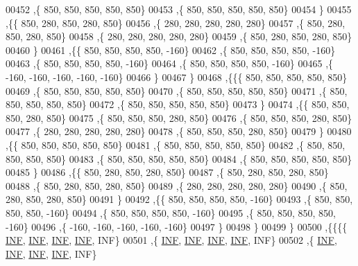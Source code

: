 \begin{DoxyCode}
00452    ,\{   850,   850,   850,   850,   850\}
00453    ,\{   850,   850,   850,   850,   850\}
00454    \}
00455   ,\{\{   850,   280,   850,   280,   850\}
00456    ,\{   280,   280,   280,   280,   280\}
00457    ,\{   850,   280,   850,   280,   850\}
00458    ,\{   280,   280,   280,   280,   280\}
00459    ,\{   850,   280,   850,   280,   850\}
00460    \}
00461   ,\{\{   850,   850,   850,   850,  -160\}
00462    ,\{   850,   850,   850,   850,  -160\}
00463    ,\{   850,   850,   850,   850,  -160\}
00464    ,\{   850,   850,   850,   850,  -160\}
00465    ,\{  -160,  -160,  -160,  -160,  -160\}
00466    \}
00467   \}
00468  ,\{\{\{   850,   850,   850,   850,   850\}
00469    ,\{   850,   850,   850,   850,   850\}
00470    ,\{   850,   850,   850,   850,   850\}
00471    ,\{   850,   850,   850,   850,   850\}
00472    ,\{   850,   850,   850,   850,   850\}
00473    \}
00474   ,\{\{   850,   850,   850,   280,   850\}
00475    ,\{   850,   850,   850,   280,   850\}
00476    ,\{   850,   850,   850,   280,   850\}
00477    ,\{   280,   280,   280,   280,   280\}
00478    ,\{   850,   850,   850,   280,   850\}
00479    \}
00480   ,\{\{   850,   850,   850,   850,   850\}
00481    ,\{   850,   850,   850,   850,   850\}
00482    ,\{   850,   850,   850,   850,   850\}
00483    ,\{   850,   850,   850,   850,   850\}
00484    ,\{   850,   850,   850,   850,   850\}
00485    \}
00486   ,\{\{   850,   280,   850,   280,   850\}
00487    ,\{   850,   280,   850,   280,   850\}
00488    ,\{   850,   280,   850,   280,   850\}
00489    ,\{   280,   280,   280,   280,   280\}
00490    ,\{   850,   280,   850,   280,   850\}
00491    \}
00492   ,\{\{   850,   850,   850,   850,  -160\}
00493    ,\{   850,   850,   850,   850,  -160\}
00494    ,\{   850,   850,   850,   850,  -160\}
00495    ,\{   850,   850,   850,   850,  -160\}
00496    ,\{  -160,  -160,  -160,  -160,  -160\}
00497    \}
00498   \}
00499  \}
00500 ,\{\{\{\{   \hyperlink{energy__const_8h_a12c2040f25d8e3a7b9e1c2024c618cb6}{INF},   \hyperlink{energy__const_8h_a12c2040f25d8e3a7b9e1c2024c618cb6}{INF},   \hyperlink{energy__const_8h_a12c2040f25d8e3a7b9e1c2024c618cb6}{INF},   \hyperlink{energy__const_8h_a12c2040f25d8e3a7b9e1c2024c618cb6}{INF},   INF\}
00501    ,\{   \hyperlink{energy__const_8h_a12c2040f25d8e3a7b9e1c2024c618cb6}{INF},   \hyperlink{energy__const_8h_a12c2040f25d8e3a7b9e1c2024c618cb6}{INF},   \hyperlink{energy__const_8h_a12c2040f25d8e3a7b9e1c2024c618cb6}{INF},   \hyperlink{energy__const_8h_a12c2040f25d8e3a7b9e1c2024c618cb6}{INF},   INF\}
00502    ,\{   \hyperlink{energy__const_8h_a12c2040f25d8e3a7b9e1c2024c618cb6}{INF},   \hyperlink{energy__const_8h_a12c2040f25d8e3a7b9e1c2024c618cb6}{INF},   \hyperlink{energy__const_8h_a12c2040f25d8e3a7b9e1c2024c618cb6}{INF},   \hyperlink{energy__const_8h_a12c2040f25d8e3a7b9e1c2024c618cb6}{INF},   INF\}

\end{DoxyCode}
